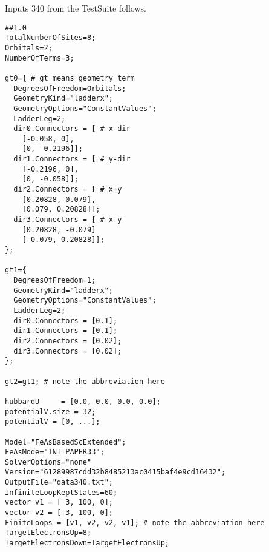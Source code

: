 \documentclass[twocolumn]{article}
\begin{document}
Inputs 340 from the TestSuite follows.
\begin{tiny}
\begin{verbatim}
##1.0
TotalNumberOfSites=8;
Orbitals=2;
NumberOfTerms=3;

gt0={ # gt means geometry term
  DegreesOfFreedom=Orbitals;
  GeometryKind="ladderx";
  GeometryOptions="ConstantValues";
  LadderLeg=2;
  dir0.Connectors = [ # x-dir
    [-0.058, 0],
    [0, -0.2196]];
  dir1.Connectors = [ # y-dir
    [-0.2196, 0],
    [0, -0.058]];
  dir2.Connectors = [ # x+y
    [0.20828, 0.079],
    [0.079, 0.20828]];
  dir3.Connectors = [ # x-y
    [0.20828, -0.079]
    [-0.079, 0.20828]];
};

gt1={
  DegreesOfFreedom=1;
  GeometryKind="ladderx";
  GeometryOptions="ConstantValues";
  LadderLeg=2;
  dir0.Connectors = [0.1];
  dir1.Connectors = [0.1];
  dir2.Connectors = [0.02];
  dir3.Connectors = [0.02]; 
};

gt2=gt1; # note the abbreviation here

hubbardU	 = [0.0, 0.0, 0.0, 0.0]; 
potentialV.size = 32;
potentialV = [0, ...];

Model="FeAsBasedScExtended";
FeAsMode="INT_PAPER33";
SolverOptions="none"
Version="61289987cdd32b8485213ac0415baf4e9cd16432";
OutputFile="data340.txt";
InfiniteLoopKeptStates=60;
vector v1 = [ 3, 100, 0];
vector v2 = [-3, 100, 0];
FiniteLoops = [v1, v2, v2, v1]; # note the abbreviation here
TargetElectronsUp=8;
TargetElectronsDown=TargetElectronsUp;
\end{verbatim}
\end{tiny}
\end{document}
